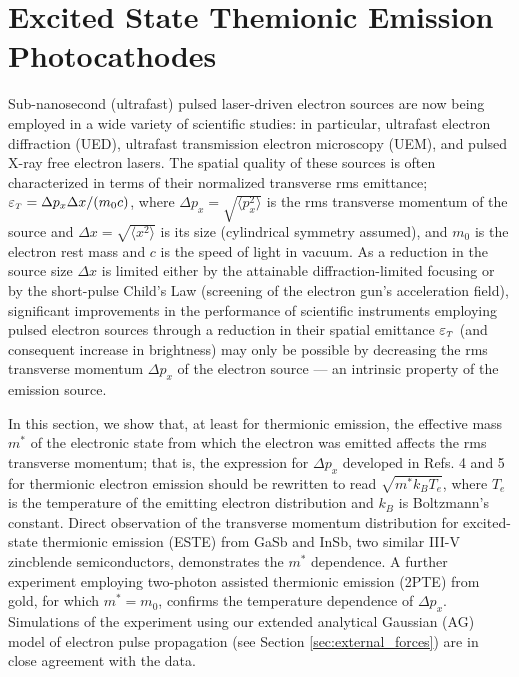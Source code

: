 
\section{Excited State Themionic Emission Photocathodes}

Sub-nanosecond (ultrafast) pulsed laser-driven electron sources are now being employed in a wide variety of scientific studies: in particular, ultrafast electron diffraction (UED)\cite{sciaini_femtosecond_2011}, ultrafast transmission electron microscopy (UEM)\cite{king_ultrafast_2005}, and pulsed X-ray free electron lasers\cite{dowell_cathode_2010}.
The spatial quality of these sources is often characterized in terms of their normalized transverse rms emittance\cite{dowell_quantum_2009,jensen_emittance_2010}; $\varepsilon_{{\scriptscriptstyle T}} = \Delta p_x \Delta x / (m_0 c)$, where $\Delta p_x = \sqrt{ \langle p_x^2 \rangle }$ is the rms transverse momentum of the source and $\Delta x = \sqrt{ \langle x^2 \rangle }$  is its size (cylindrical symmetry assumed), and $m_0$ is the electron rest mass and $c$ is the speed of light in vacuum.
As a reduction in the source size $\Delta x$ is limited either by the attainable diffraction-limited focusing or by the short-pulse Child's Law (screening of the electron gun's acceleration field)\cite{valfells_effects_2002}, significant improvements in the performance of scientific instruments employing pulsed electron sources through a reduction in their spatial emittance $\varepsilon_{{\scriptscriptstyle T}}$ (and consequent increase in brightness\cite{berger_dc_2009}) may only be possible by decreasing the rms transverse momentum $\Delta p_x$ of the electron source --- an intrinsic property of the emission source\cite{dowell_quantum_2009,jensen_emittance_2010}.  

In this section, we show that, at least for thermionic emission, the effective mass $m^*$ of the electronic state from which the electron was emitted affects the rms transverse momentum; that is, the expression for $\Delta p_x$ developed in Refs. 4 and 5 for thermionic electron emission should be rewritten to read $\sqrt{m^* k_B T_e}$, where $T_e$ is the temperature of the emitting electron distribution and $k_B$ is Boltzmann's constant.
Direct observation of the transverse momentum distribution for excited-state thermionic emission (ESTE) from GaSb and InSb, two similar III-V zincblende semiconductors, demonstrates the $m^*$ dependence.  A further experiment employing two-photon assisted thermionic emission (2PTE) from gold, for which $m^* = m_0$\cite{johnson_optical_1972}, confirms the temperature dependence of $\Delta p_x$.  Simulations of the experiment using our extended analytical Gaussian (AG) model of electron pulse propagation (see Section \ref{sec:external_forces}) are in close agreement with the data. 

